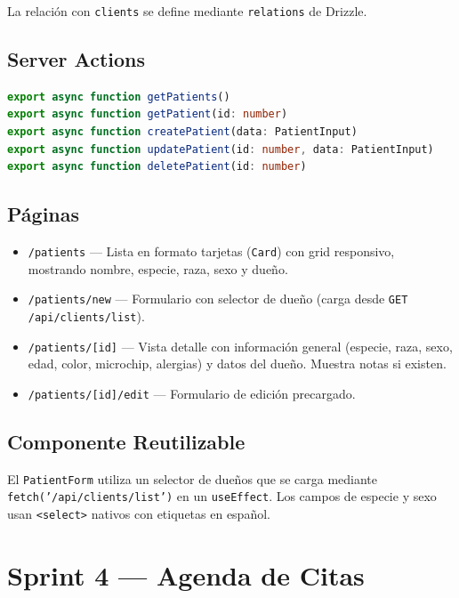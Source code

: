 \documentclass[12pt,a4paper]{article}
\begin{document}
La relación con \texttt{clients} se define mediante \texttt{relations} de Drizzle.

\subsection{Server Actions}

\begin{lstlisting}[language=TypeScript, caption=API de server actions para pacientes]
export async function getPatients()
export async function getPatient(id: number)
export async function createPatient(data: PatientInput)
export async function updatePatient(id: number, data: PatientInput)
export async function deletePatient(id: number)
\end{lstlisting}

\subsection{Páginas}

\begin{itemize}[leftmargin=*]
    \item \texttt{/patients} --- Lista en formato tarjetas (\texttt{Card}) con
          grid responsivo, mostrando nombre, especie, raza, sexo y dueño.
    \item \texttt{/patients/new} --- Formulario con selector de dueño (carga
          desde \texttt{GET /api/clients/list}).
    \item \texttt{/patients/[id]} --- Vista detalle con información general
          (especie, raza, sexo, edad, color, microchip, alergias) y datos
          del dueño. Muestra notas si existen.
    \item \texttt{/patients/[id]/edit} --- Formulario de edición precargado.
\end{itemize}

\subsection{Componente Reutilizable}

El \texttt{PatientForm} utiliza un selector de dueños que se carga mediante
\texttt{fetch('/api/clients/list')} en un \texttt{useEffect}. Los campos de
especie y sexo usan \texttt{<select>} nativos con etiquetas en español.

\section{Sprint 4 --- Agenda de Citas}
\end{document}
